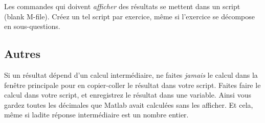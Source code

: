 Les commandes qui doivent \emph{afficher} des résultats se mettent dans un script (blank M-file). Créez un tel script par exercice, même si l'exercice se décompose en sous-questions.

\subsection{Autres}

Si un résultat dépend d'un calcul intermédiaire, ne faites \emph{jamais} le calcul dans la fenêtre principale pour en copier-coller le résultat dans votre script. Faites faire le calcul dans votre script, et enregistrez le résultat dans une variable. Ainsi vous gardez toutes les décimales que Matlab avait calculées sans les afficher. Et cela, même si ladite réponse intermédiaire est un nombre entier.
